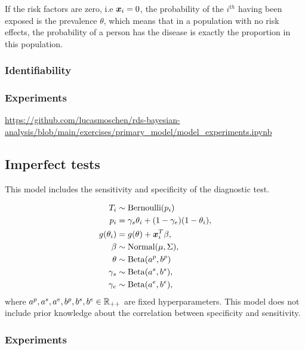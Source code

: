 \begin{remark}
  If the risk factors are zero, i.e $\boldsymbol{x}_i = 0$, the probability of the
  $i^{th}$ having been exposed is the prevalence $\theta$, which means that in
  a population with no risk effects, the probability of a person has the
  disease is exactly the proportion in this population. 
\end{remark}

\subsubsection{Identifiability}

\subsubsection{Experiments}

\url{https://github.com/lucasmoschen/rds-bayesian-analysis/blob/main/exercises/primary_model/model_experiments.ipynb}

\subsection{Imperfect tests}

This model includes the sensitivity and specificity of the diagnostic test. 

\begin{equation}
  \begin{aligned}
    T_i &\sim \operatorname{Bernoulli}(p_i) \\
    p_i &= \gamma_s\theta_i + (1-\gamma_e)(1 - \theta_i),  \\
    g(\theta_i) &= g(\theta) + \boldsymbol{x}_i^T\beta,  \\
    \beta &\sim \operatorname{Normal}(\mu, \Sigma), \\ 
    \theta &\sim \operatorname{Beta}(a^p, b^p) \\
    \gamma_s &\sim \operatorname{Beta}(a^s, b^s), \\
    \gamma_e &\sim \operatorname{Beta}(a^e, b^e), \\    
  \end{aligned}  
\end{equation}
where $a^p, a^s, a^e, b^p, b^s, b^e \in \mathbb{R}_{++}$ are fixed hyperparameters.
This model does not include prior knowledge about the correlation between
specificity and sensitivity. 

\subsubsection{Experiments}

